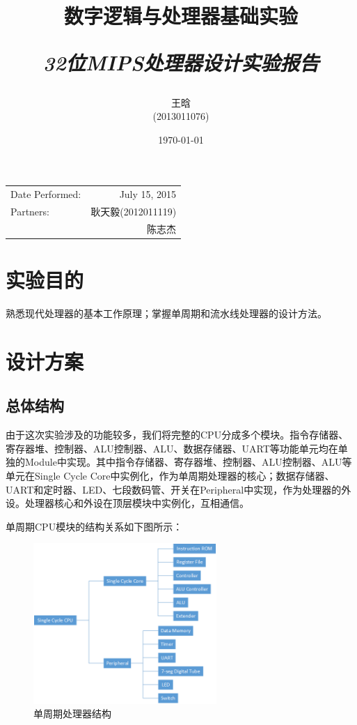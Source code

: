 \documentclass{article}
\title{\textbf{数字逻辑与处理器基础实验} \\ [2ex] \begin{large} \emph{32位MIPS处理器设计实验报告} \end{large} }
\author{王晗 \\ (2013011076)}
\date{\today}
\begin{document}
    \maketitle

    \begin{table}[htb]
        \centering
        \begin{tabular}{lr}
            Date Performed: & July 15, 2015 \\
            Partners:   & 耿天毅(2012011119) \\
                        & 陈志杰 \fbox{\begin{small}\emph{~~withdrawn~~}\end{small}} \\
        \end{tabular}
    \end{table}

    \section{实验目的}
        熟悉现代处理器的基本工作原理；掌握单周期和流水线处理器的设计方法。

    \section{设计方案}
        \subsection{总体结构}
            由于这次实验涉及的功能较多，我们将完整的CPU分成多个模块。指令存储器、寄存器堆、控制器、ALU控制器、ALU、数据存储器、UART等功能单元均在单独的Module中实现。其中指令存储器、寄存器堆、控制器、ALU控制器、ALU等单元在Single Cycle Core中实例化，作为单周期处理器的核心；数据存储器、UART和定时器、LED、七段数码管、开关在Peripheral中实现，作为处理器的外设。处理器核心和外设在顶层模块中实例化，互相通信。
            
            单周期CPU模块的结构关系如下图所示：
            \begin{figure}[H]
                    \centering
                    \includegraphics[width=0.62\textwidth]{images/singlecycle.png}
                    \caption{\label{fig:singlecycle}单周期处理器结构}
                \end{figure}
            
\end{document}

